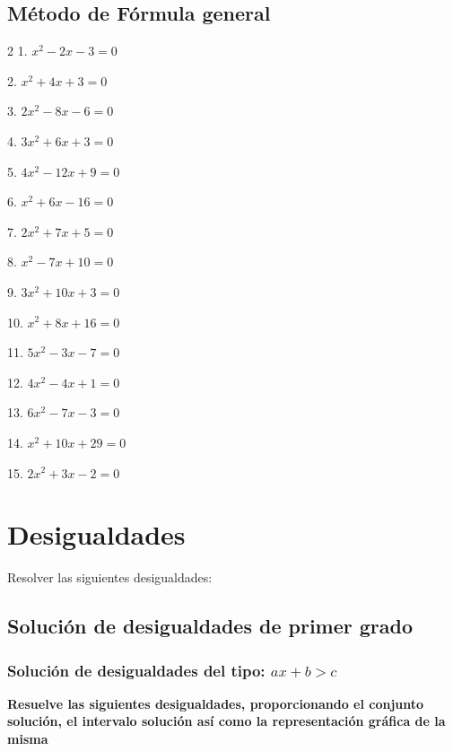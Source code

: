 \documentclass[12pt]{article}
\begin{document}
\subsection{Método de Fórmula
general}\label{muxe9todo-de-fuxf3rmula-general}
\begin{multicols}{2}
1. $x^2 - 2x - 3 = 0$

2. $x^2 + 4x + 3 = 0$

3. $2x^2 - 8x - 6 = 0$

4. $3x^2 + 6x + 3 = 0$

5. $4x^2 - 12x + 9 = 0$

6. $x^2 + 6x - 16 = 0$

7. $2x^2 + 7x + 5 = 0$

8. $x^2 - 7x + 10 = 0$

9. $3x^2 + 10x + 3 = 0$

10. $x^2 + 8x + 16 = 0$

11. $5x^2 - 3x - 7 = 0$

12. $4x^2 - 4x + 1 = 0$

13. $6x^2 - 7x - 3 = 0$

14. $x^2 + 10x + 29 = 0$

15. $2x^2 + 3x - 2 = 0$
\end{multicols}



\section{Desigualdades}\label{desigualdades}
Resolver las siguientes desigualdades:

\subsection{Solución de desigualdades de primer
grado}\label{soluciuxf3n-de-desigualdades-de-primer-grado}
\subsubsection{\texorpdfstring{Solución de desigualdades del tipo:
\(ax+b>c\)}{Solución de desigualdades del tipo: ax+b\textgreater c}}\label{soluciuxf3n-de-desigualdades-del-tipo-axbc}
\textbf{Resuelve las siguientes desigualdades, proporcionando el
conjunto solución, el intervalo solución así como la representación
gráfica de la misma}
\end{document}
